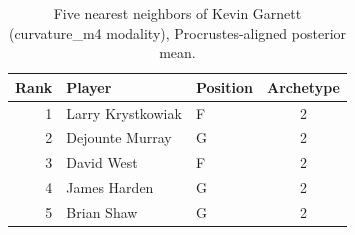 \begin{table}[htbp]
  \centering\small
  \begin{tabular}{rllc}
    \toprule
    Rank & Player & Position & Archetype \\
    \midrule
    1 & Larry Krystkowiak & F & 2 \\
    2 & Dejounte Murray & G & 2 \\
    3 & David West & F & 2 \\
    4 & James Harden & G & 2 \\
    5 & Brian Shaw & G & 2 \\
    \bottomrule
  \end{tabular}
  \caption{Five nearest neighbors of Kevin Garnett (curvature_m4 modality), Procrustes-aligned posterior mean.}
  \label{tab:Kevin_Garnett_neighbors_curvature_m4}
\end{table}

